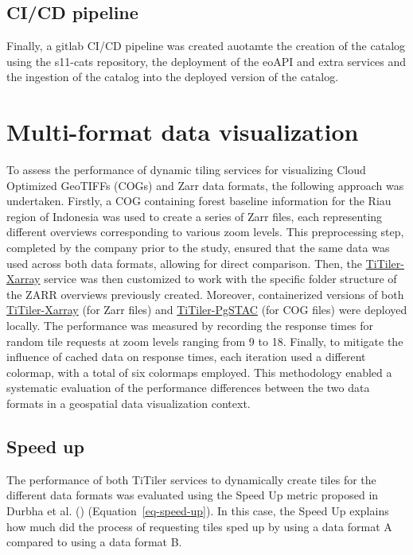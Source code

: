 \documentclass[
  oneside,
  open=any]{scrbook}
\begin{document}
\subsection{CI/CD pipeline}\label{cicd-pipeline}

Finally, a gitlab CI/CD pipeline was created auotamte the creation of
the catalog using the s11-cats repository, the deployment of the eoAPI
and extra services and the ingestion of the catalog into the deployed
version of the catalog.

\section{Multi-format data
visualization}\label{multi-format-data-visualization}

To assess the performance of dynamic tiling services for visualizing
Cloud Optimized GeoTIFFs (COGs) and Zarr data formats, the following
approach was undertaken. Firstly, a COG containing forest baseline
information for the Riau region of Indonesia was used to create a series
of Zarr files, each representing different overviews corresponding to
various zoom levels. This preprocessing step, completed by the company
prior to the study, ensured that the same data was used across both data
formats, allowing for direct comparison. Then, the
\href{https://github.com/developmentseed/titiler-xarray}{TiTiler-Xarray}
service was then customized to work with the specific folder structure
of the ZARR overviews previously created. Moreover, containerized
versions of both
\href{https://github.com/developmentseed/titiler-xarray}{TiTiler-Xarray}
(for Zarr files) and
\href{https://github.com/stac-utils/titiler-pgstac}{TiTiler-PgSTAC} (for
COG files) were deployed locally. The performance was measured by
recording the response times for random tile requests at zoom levels
ranging from 9 to 18. Finally, to mitigate the influence of cached data
on response times, each iteration used a different colormap, with a
total of six colormaps employed. This methodology enabled a systematic
evaluation of the performance differences between the two data formats
in a geospatial data visualization context.

\subsection{Speed up}\label{speed-up}

The performance of both TiTiler services to dynamically create tiles for
the different data formats was evaluated using the Speed Up metric
proposed in Durbha et al. ()
(Equation~\ref{eq-speed-up}). In this case, the Speed Up explains how
much did the process of requesting tiles sped up by using a data format
A compared to using a data format B.
\end{document}
